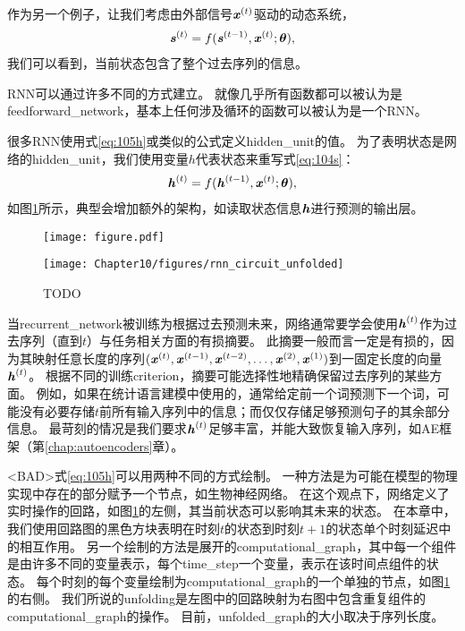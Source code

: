
作为另一个例子，让我们考虑由外部信号$\boldsymbol{\mathit{x}}^{(t)}$驱动的动态系统，
\begin{align}
 \label{eq:104s}
 \boldsymbol{\mathit{s}}^{(t)} = f(\boldsymbol{\mathit{s}}^{(t-1)}, \boldsymbol{\mathit{x}}^{(t)} ; \boldsymbol{\theta}),
\end{align}
我们可以看到，当前状态包含了整个过去序列的信息。



\gls{RNN}可以通过许多不同的方式建立。
就像几乎所有函数都可以被认为是\gls{feedforward_network}，基本上任何涉及循环的函数可以被认为是一个\gls{RNN}。



很多\gls{RNN}使用式\eqref{eq:105h}或类似的公式定义\gls{hidden_unit}的值。
为了表明状态是网络的\gls{hidden_unit}，我们使用变量$h$代表状态来重写式\eqref{eq:104s}：
\begin{align}
 \label{eq:105h}
 \boldsymbol{\mathit{h}}^{(t)} = f(\boldsymbol{\mathit{h}}^{(t-1)}, \boldsymbol{\mathit{x}}^{(t)} ; \boldsymbol{\theta}),
\end{align}
如图\ref{fig:chap10_rnn_circuit_unfolded}所示，典型会增加额外的架构，如读取状态信息$\boldsymbol{\mathit{h}}$进行预测的输出层。
\begin{figure}[!htb]
\ifOpenSource
\centerline{\texttt{[image: figure.pdf]}}
\else
\centerline{\texttt{[image: Chapter10/figures/rnn\_circuit\_unfolded]}}
\fi
\caption{TODO}
\label{fig:chap10_rnn_circuit_unfolded}
\end{figure}



当\gls{recurrent_network}被训练为根据过去预测未来，网络通常要学会使用$\boldsymbol{\mathit{h}}^{(t)}$作为过去序列（直到$t$）与任务相关方面的有损摘要。
此摘要一般而言一定是有损的，因为其映射任意长度的序列$(\boldsymbol{\mathit{x}}^{(t)},\boldsymbol{\mathit{x}}^{(t-1)}, \boldsymbol{\mathit{x}}^{(t-2)},\dots,\boldsymbol{\mathit{x}}^{(2)}, \boldsymbol{\mathit{x}}^{(1)})$到一固定长度的向量$\boldsymbol{\mathit{h}}^{(t)}$。
根据不同的训练\gls{criterion}，摘要可能选择性地精确保留过去序列的某些方面。
例如，如果在统计语言建模中使用的，通常给定前一个词预测下一个词，可能没有必要存储$t$前所有输入序列中的信息；而仅仅存储足够预测句子的其余部分信息。
最苛刻的情况是我们要求$\boldsymbol{\mathit{h}}^{(t)}$足够丰富，并能大致恢复输入序列，如\gls{AE}框架（第\ref{chap:autoencoders}章）。


<BAD>式\eqref{eq:105h}可以用两种不同的方式绘制。
一种方法是为可能在模型的物理实现中存在的部分赋予一个节点，如生物神经网络。
在这个观点下，网络定义了实时操作的回路，如图\ref{fig:chap10_rnn_circuit_unfolded}的左侧，其当前状态可以影响其未来的状态。
在本章中，我们使用回路图的黑色方块表明在时刻$t$的状态到时刻$t+1$的状态单个时刻延迟中的相互作用。
另一个绘制的方法是展开的\gls{computational_graph}，其中每一个组件是由许多不同的变量表示，每个\gls{time_step}一个变量，表示在该时间点组件的状态。
每个时刻的每个变量绘制为\gls{computational_graph}的一个单独的节点，如图\ref{fig:chap10_rnn_circuit_unfolded}的右侧。
我们所说的\gls{unfolding}是左图中的回路映射为右图中包含重复组件的\gls{computational_graph}的操作。
目前，\gls{unfolded_graph}的大小取决于序列长度。




